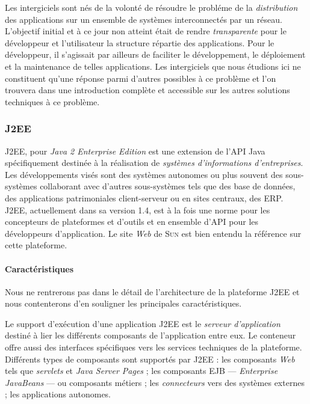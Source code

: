 Les intergiciels sont n\'es de  la volont\'e
de r\'esoudre le probl\'eme de la \emph{distribution} des applications sur
un ensemble de syst\`emes interconnect\'es par un
r\'eseau. L'objectif initial et \`a ce jour non atteint \'etait de
rendre \emph{transparente} pour le d\'eveloppeur et l'utilisateur la
structure r\'epartie des applications. Pour le d\'eveloppeur, il
s'agissait par ailleurs de faciliter le d\'eveloppement, le
d\'eploiement et la maintenance de telles applications. Les intergiciels
que nous \'etudions ici ne constituent qu'une r\'eponse parmi
d'autres possibles \`a ce probl\`eme et l'on trouvera dans
\cite{tannenbaum-dist-syst} une introduction compl\`ete et accessible
sur les autres solutions techniques \`a ce probl\`eme. 

\subsubsection{J2EE}
\label{sec:j2ee}

\textsf{J2EE}, pour \emph{Java 2 Enterprise Edition}  est une
extension de l'\textsf{API Java}
sp\'ecifiquement destin\'ee \`a la r\'ealisation de \emph{syst\`emes
d'informations d'entreprises}. Les d\'eveloppements vis\'es sont
des syst\`emes autonomes ou plus souvent des sous-syst\`emes collaborant avec d'autres
sous-syst\`emes tels que des base de donn\'ees, des applications
patrimoniales client-serveur ou en sites centraux, des
\textsf{ERP}. \textsf{J2EE}, actuellement dans sa version 1.4, est \`a la fois une norme pour les concepteurs de
plateformes et d'outils et en ensemble d'API pour les
d\'eveloppeurs d'application.  Le site \emph{Web} de \textsc{Sun} est
bien entendu la r\'ef\'erence sur cette plateforme\cite{ejbspec,j2eespec}. 

\paragraph{Caract\'eristiques}

Nous ne rentrerons pas dans le d\'etail de l'architecture de la
plateforme \textsf{J2EE} et nous contenterons d'en souligner les
principales caract\'eristiques.

Le support d'ex\'ecution d'une application \textsf{J2EE} est le \emph{serveur
d'application}
destin\'e \`a lier les diff\'erents composants de l'application
entre eux. Le conteneur offre aussi des interfaces sp\'ecifiques vers
les services techniques de la plateforme. Diff\'erents types de
composants sont support\'es par \textsf{J2EE} :  les composants
\emph{Web} tels que  \emph{servlets} et \emph{Java Server Pages} ; les composants \textsf{EJB} --- \emph{Enterprise JavaBeans} --- ou
  composants m\'etiers ; les \emph{connecteurs} vers des syst\`emes
  externes ; les applications autonomes.

